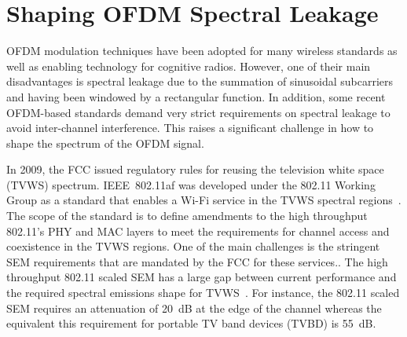 \section{Shaping OFDM Spectral Leakage}
\label{Ch2:SpecLeak}
OFDM modulation techniques have been adopted for many wireless standards as well as enabling technology for cognitive radios.
However, one of their main disadvantages is spectral leakage due to the summation of sinusoidal subcarriers and having been windowed by a rectangular function.
In addition, some recent OFDM-based standards demand very strict requirements on spectral leakage to avoid inter-channel interference.
This raises a significant challenge in how to shape the spectrum of the OFDM signal. 

In 2009, the FCC issued regulatory rules for reusing the television white space (TVWS) spectrum.
IEEE~802.11af was developed under the 802.11 Working Group as a standard that enables a Wi-Fi service in the TVWS spectral regions~\cite{802-11af2013}. 
The scope of the standard is to define amendments to the high throughput 802.11's PHY and MAC layers to meet the requirements for channel access and coexistence in the TVWS regions.
One of the main challenges is the stringent SEM requirements that are mandated by the FCC for these services.. 
The high throughput 802.11 scaled SEM has a large gap between current performance and the required spectral emissions shape for TVWS~\cite{Shellhammer2009}.
For instance, the 802.11 scaled SEM requires an attenuation of 20~dB at the edge of the channel whereas the equivalent this requirement for portable TV band devices (TVBD) is 55~dB.

